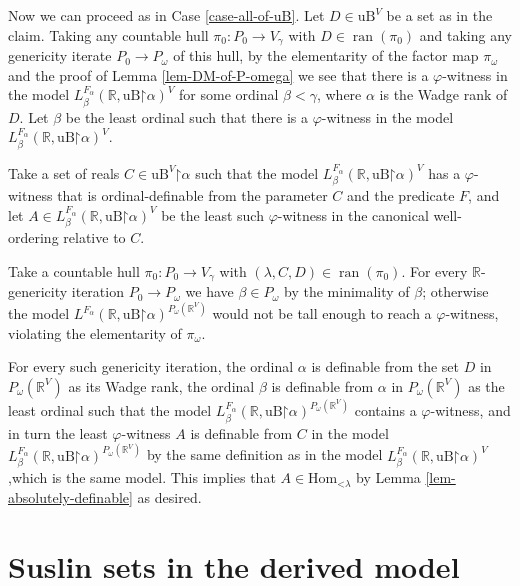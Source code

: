 \documentclass[fleqn, 11pt]{amsart}
\theoremstyle{plain}
\theoremstyle{definition}
\theoremstyle{remark}
\newcommand{\Hom}{\mathrm{Hom}}
\newcommand{\uB}{\mathrm{uB}}
\newcommand{\restrict}{\mathord{\restriction}}
\DeclareMathOperator{\ran}{ran}
\begin{document}
Now we can proceed as in Case \ref{case-all-of-uB}.  Let $D \in \uB^V$ be a set as in the claim. Taking any countable hull $\pi_0 : P_0 \to V_{\gamma}$ with $D \in \ran(\pi_0)$ and taking any genericity iterate $P_0 \to P_\omega$ of this hull, by the elementarity of the factor map $\pi_\omega$ and the proof of Lemma \ref{lem-DM-of-P-omega} we see that there is a $\varphi$-witness in the model $L_\beta^{F_\alpha}(\mathbb{R}, \uB \restrict \alpha)^V$ for some ordinal $\beta < \gamma$, where $\alpha$ is the Wadge rank of $D$. Let $\beta$ be the least ordinal such that there is a $\varphi$-witness in the model $L_\beta^{F_\alpha}(\mathbb{R}, \uB \restrict \alpha)^V$.

Take a set of reals $C \in \uB^V \restrict \alpha$ such that the model $L_\beta^{F_\alpha}(\mathbb{R}, \uB \restrict \alpha)^V$ has a $\varphi$-witness that is ordinal-definable from the parameter $C$ and the predicate $F$, and let $A \in L_\beta^{F_\alpha}(\mathbb{R}, \uB \restrict \alpha)^V$ be the least such $\varphi$-witness in the canonical well-ordering relative to $C$. 

Take a countable hull $\pi_0 \colon P_0 \to V_{\gamma}$ with $(\lambda,C,D) \in \ran(\pi_0)$. For every $\mathbb{R}$-genericity iteration $P_0 \to P_\omega$ we have $\beta \in P_\omega$ by the minimality of $\beta$; otherwise the model $L^{F_\alpha}(\mathbb{R}, \uB \restrict \alpha)^{P_\omega(\mathbb{R}^V)}$ would not be tall enough to reach a $\varphi$-witness, violating the elementarity of $\pi_\omega$.

For every such genericity iteration, the ordinal $\alpha$ is definable from the set $D$ in $P_\omega(\mathbb{R}^V)$ as its Wadge rank, the ordinal $\beta$ is definable from $\alpha$ in $P_\omega(\mathbb{R}^V)$ as the least ordinal such that the model $L_\beta^{F_\alpha}(\mathbb{R}, \uB \restrict \alpha)^{P_\omega(\mathbb{R}^V)}$ contains a $\varphi$-witness, and in turn the least $\varphi$-witness $A$ is definable from $C$ in the model $L_\beta^{F_\alpha}(\mathbb{R}, \uB \restrict \alpha)^{P_\omega(\mathbb{R}^V)}$ by the same definition as in the model $L_\beta^{F_\alpha}(\mathbb{R}, \uB \restrict \alpha)^V$,which is the same model. This implies that $A \in \Hom_{\mathord{<}\lambda}$ by Lemma \ref{lem-absolutely-definable} as desired.







\section{Suslin sets in the derived model}\label{sec-DM-at-limit-of-lt-lambda-strongs}
\end{document}
